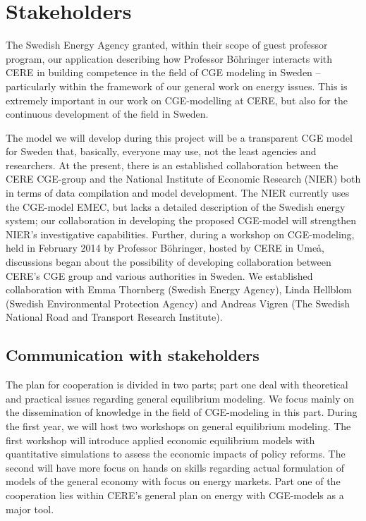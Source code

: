 \section{Stakeholders}
The Swedish Energy Agency granted, within their scope of guest professor program, our application describing how Professor Böhringer interacts with CERE in building competence in the field of CGE modeling in Sweden – particularly within the framework of our general work on energy issues. This is extremely important in our work on CGE-modelling at CERE, but also for the continuous development of the field in Sweden.

The model we will develop during this project will be a transparent CGE model for Sweden that, basically, everyone may use,  not the least agencies and researchers. At the present, there is an established collaboration between the CERE CGE-group and the National Institute of Economic Research (NIER) both in terms of data compilation and model development. The NIER currently uses the CGE-model EMEC, but lacks a detailed description of the Swedish energy system; our collaboration in developing the proposed CGE-model will strengthen NIER's investigative capabilities. Further, during a workshop on CGE-modeling, held in February 2014 by Professor Böhringer, hosted by CERE in Umeå, discussions began about the possibility of developing collaboration between CERE's CGE group and various authorities in Sweden. We established collaboration with Emma Thornberg (Swedish Energy Agency), Linda Hellblom (Swedish Environmental Protection Agency) and Andreas Vigren (The Swedish National Road and Transport Research Institute).

\subsection{Communication with stakeholders}
The plan for cooperation is divided in two parts; part one deal with theoretical and practical issues regarding general equilibrium modeling. We focus mainly on the dissemination of knowledge in the field of CGE-modeling in this part. During the first year, we will host two workshops on general equilibrium modeling. The first workshop will introduce applied economic equilibrium models with quantitative simulations to assess the economic impacts of policy reforms. The second will have more focus on hands on skills regarding actual formulation of models of the general economy with focus on energy markets. Part one of the cooperation lies within CERE's general plan on energy with CGE-models as a major tool.

